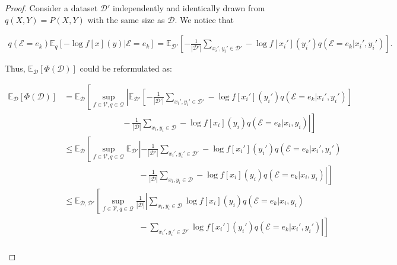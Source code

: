\begin{proof}
Consider a dataset $\mathcal D'$ independently and identically drawn from $q(X,Y) = P(X,Y)$ with the same size as $\mathcal D$. We notice that
\begin{small}
\begin{align}
    q(\mathcal E=e_k)\mathbb E_{q} \left[ -\log f[x](y)|\mathcal E=e_k \right]
    = \mathbb E_{\mathcal D'} \left[ -\frac{1}{|\mathcal D'|} \sum_{x_i',y_i' \in \mathcal D'} -\log f[x_i'](y_i') q(\mathcal E=e_k|x_i',y_i') \right].
\end{align}
\end{small}
Thus, $\mathbb E_{\mathcal D}[\Phi(\mathcal D)]$ could be reformulated as:
\begin{small}
\begin{align}
    \mathbb E_{\mathcal D}[\Phi(\mathcal D)] &= \mathbb E_{\mathcal D}\left[ \sup_{f\in \mathcal V, q \in \mathcal Q}  \left| \mathbb E_{\mathcal D'} \left[ -\frac{1}{|\mathcal D'|} \sum_{x_i',y_i' \in \mathcal D'} -\log f[x_i'](y_i') q(\mathcal E=e_k|x_i',y_i') \right] 
    \right.\right.\\
    &\left.\left. \quad\quad\quad\quad\quad\quad\quad - \frac{1}{|\mathcal D|} \sum_{x_i,y_i \in \mathcal D} -\log f[x_i](y_i) q(\mathcal E=e_k|x_i,y_i) \right| \right] \\
    &\leq \mathbb E_{\mathcal D}\left[ \sup_{f\in \mathcal V, q \in \mathcal Q} \mathbb E_{\mathcal D'} \left| -\frac{1}{|\mathcal D'|} \sum_{x_i',y_i' \in \mathcal D'} -\log f[x_i'](y_i') q(\mathcal E=e_k|x_i',y_i') \right.\right. \\
    &\left.\left.\quad\quad\quad\quad\quad\quad\quad\quad\quad - \frac{1}{|\mathcal D|} \sum_{x_i,y_i \in \mathcal D} -\log f[x_i](y_i) q(\mathcal E=e_k|x_i,y_i) \right| \right] \\
    \label{equ:err_1}
    &\leq \mathbb E_{\mathcal D, \mathcal D'} \left[  \sup_{f\in \mathcal V, q \in \mathcal Q} \frac{1}{|\mathcal D|} \left| \sum_{x_i,y_i \in \mathcal D} \log f[x_i](y_i) q(\mathcal E=e_k|x_i,y_i) \right.\right.\\
    &\left.\left.\quad\quad\quad\quad\quad\quad\quad\quad\quad - \sum_{x_i',y_i' \in \mathcal D'} \log f[x_i'](y_i') q(\mathcal E=e_k|x_i',y_i') \right| \right] \\

\end{align}
\end{small}
\end{proof}
